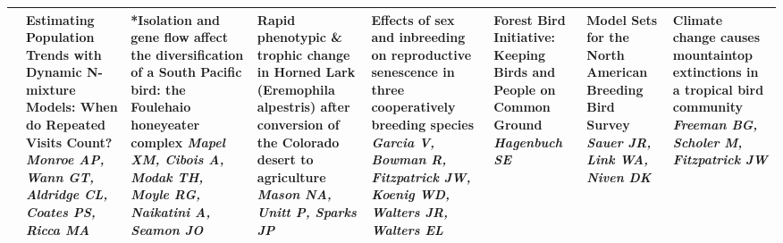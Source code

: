 \begin{tabular}{|x{0.85cm}|x{2.85cm}|x{2.85cm}|x{2.85cm}|x{2.85cm}|a{2.85cm}|a{2.85cm}|a{2.85cm}|}
&Estimating Population Trends with Dynamic N-mixture Models: When do Repeated Visits Count? \newline \newline \textit{Monroe AP, Wann GT, Aldridge CL, Coates PS, Ricca MA} & *Isolation and gene flow affect the diversification of a South Pacific bird: the Foulehaio honeyeater complex \newline \newline \textit{Mapel XM, Cibois A, Modak TH, Moyle RG, Naikatini A, Seamon JO} & Rapid phenotypic \& trophic change in Horned Lark (Eremophila alpestris) after conversion of the Colorado desert to agriculture \newline \newline \textit{Mason NA, Unitt P, Sparks JP} & Effects of sex and inbreeding on reproductive senescence in three cooperatively breeding species \newline \newline \textit{Garcia V, Bowman R, Fitzpatrick JW, Koenig WD, Walters JR, Walters EL} & Forest Bird Initiative: Keeping Birds and People on Common Ground \newline \newline \textit{Hagenbuch SE} & Model Sets for the North American Breeding Bird Survey \newline \newline \textit{Sauer JR, Link WA, Niven DK} & Climate change causes mountaintop extinctions in a tropical bird community \newline \newline \textit{Freeman BG, Scholer M, Fitzpatrick JW}\\
\hline

\end{tabular}
